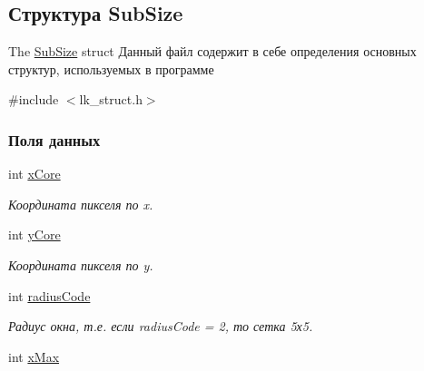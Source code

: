 \hypertarget{structSubSize}{}\subsection{Структура Sub\+Size}
\label{structSubSize}


The \hyperlink{structSubSize}{Sub\+Size} struct Данный файл содержит в себе определения основных структур, используемых в программе  




{\ttfamily \#include $<$lk\+\_\+struct.\+h$>$}

\subsubsection*{Поля данных}
\begin{DoxyCompactItemize}
\item 
\hypertarget{structSubSize_a9a1b2449d14d8975167f502f9b012995}{}int \hyperlink{structSubSize_a9a1b2449d14d8975167f502f9b012995}{x\+Core}\label{structSubSize_a9a1b2449d14d8975167f502f9b012995}

\begin{DoxyCompactList}\small\item\em Координата пикселя по x. \end{DoxyCompactList}\item 
\hypertarget{structSubSize_abc2fe5b09e9d0a43edefb0dc3de42ba3}{}int \hyperlink{structSubSize_abc2fe5b09e9d0a43edefb0dc3de42ba3}{y\+Core}\label{structSubSize_abc2fe5b09e9d0a43edefb0dc3de42ba3}

\begin{DoxyCompactList}\small\item\em Координата пикселя по y. \end{DoxyCompactList}\item 
\hypertarget{structSubSize_abd7a50490a892fed08a770fdefa1c82c}{}int \hyperlink{structSubSize_abd7a50490a892fed08a770fdefa1c82c}{radius\+Code}\label{structSubSize_abd7a50490a892fed08a770fdefa1c82c}

\begin{DoxyCompactList}\small\item\em Радиус окна, т.\+е. если radius\+Code = 2, то сетка 5х5. \end{DoxyCompactList}\item 
\hypertarget{structSubSize_a24476a31c8378df3ccecf0b500e68e86}{}int \hyperlink{structSubSize_a24476a31c8378df3ccecf0b500e68e86}{x\+Max}\label{structSubSize_a24476a31c8378df3ccecf0b500e68e86}


\end{DoxyCompactItemize}
